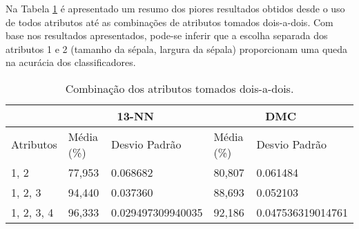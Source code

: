 \documentclass{article}
\begin{document}
Na Tabela \ref{tab:combinacao_total} é apresentado um resumo dos piores resultados obtidos desde o uso de todos atributos até as combinações de atributos tomados dois-a-dois. Com base nos resultados apresentados, pode-se inferir que a escolha separada dos atributos 1 e 2 (tamanho da sépala, largura da sépala) proporcionam uma queda na acurácia dos classificadores.

\begin{table}[!h]
	\centering
	\vspace{0.5cm}
\begin{tabular}{l|l|l|l|l|}
\cline{2-5}
                                & \multicolumn{2}{c|}{13-NN} & \multicolumn{2}{c|}{DMC}   \\ \hline
\multicolumn{1}{|l|}{Atributos} & Média (\%) & Desvio Padrão & Média (\%) & Desvio Padrão \\ \hline
\multicolumn{1}{|l|}{1, 2} & 77,953 & \num{0,068682} & 80,807 & \num{0,061484}       \\ \hline
\multicolumn{1}{|l|}{1, 2, 3} & 94,440 & \num{0,037360} & 88,693 & \num{0,052103}       \\ \hline
\multicolumn{1}{|l|}{1, 2, 3, 4} & 96,333 & \num{0,029497309940035} & 92,186 & \num{0,047536319014761} \\ \hline

\end{tabular}
\caption{Combinação dos atributos tomados dois-a-dois.}\label{tab:combinacao_total}
\end{table}


%
\end{document}
